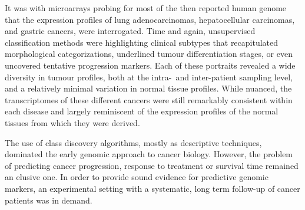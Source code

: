 It was with microarrays probing for most of the then reported human genome that
the expression profiles of lung adenocarcinomas\cite{garber_diversity_2001},
hepatocellular carcinomas,\cite{chen_gene_2002} and gastric
cancers,\cite{leung_phospholipase_2002} were interrogated.  Time and again,
unsupervised classification methods were highlighting clinical subtypes that
recapitulated morphological categorizations, underlined tumour differentiation
stages, or even uncovered tentative progression markers.  Each of these
portraits revealed a wide diversity in tumour profiles, both at the \mbox{intra-
  and} \mbox{inter-patient} sampling level, and a relatively minimal variation
in normal tissue profiles.  While nuanced, the transcriptomes of these different
cancers were still remarkably consistent within each disease and largely
reminiscent of the expression profiles of the normal tissues from which they
were derived.\cite{botstein_genomic_2003}

The use of class discovery algorithms, mostly as descriptive techniques,
dominated the early genomic approach to cancer
biology.\cite{matros_genomic_2004,eschrich_dna_2004} However, the problem of
predicting cancer progression, response to treatment or survival time remained
an elusive one.  In order to provide sound evidence for predictive genomic
markers, an experimental setting with a systematic, long term follow-up of
cancer patients was in demand.

\medskip




